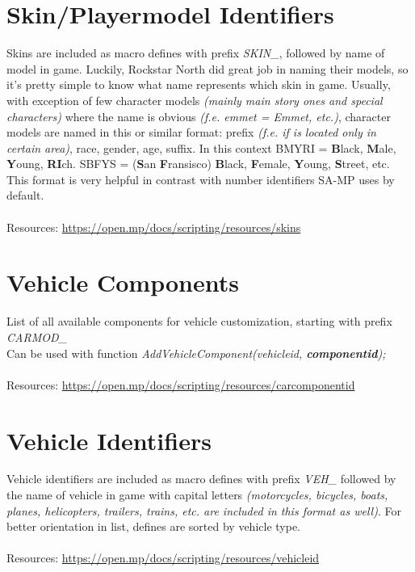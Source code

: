 \documentclass{article}
\begin{document}
\newpage
\section{Skin/Playermodel Identifiers}
Skins are included as macro defines with prefix \textit{SKIN\_}, followed by name of model in game. Luckily, Rockstar North did great job in naming their models, so it's pretty simple to know what name represents which skin in game. Usually, with exception of few character models \textit{(mainly main story ones and special characters)} where the name is obvious \textit{(f.e. emmet = Emmet, etc.)}, character models are named in this or similar format: prefix \textit{(f.e. if is located only in certain area)}, race, gender, age, suffix. In this context BMYRI = \textbf{B}lack, \textbf{M}ale, \textbf{Y}oung, \textbf{RI}ch. SBFYS = (\textbf{S}an \textbf{F}ransisco) \textbf{B}lack, \textbf{F}emale, \textbf{Y}oung, \textbf{S}treet, etc. This format is very helpful in contrast with number identifiers SA-MP uses by default.
\\
\\Resources: \url{https://open.mp/docs/scripting/resources/skins}


\section{Vehicle Components}
List of all available components for vehicle customization, starting with prefix \textit{CARMOD\_}\\Can be used with function \textit{AddVehicleComponent(vehicleid, \textbf{componentid});}
\\
\\Resources: \url{https://open.mp/docs/scripting/resources/carcomponentid}


\section{Vehicle Identifiers}
Vehicle identifiers are included as macro defines with prefix \textit{VEH\_} followed by the name of vehicle in game with capital letters \textit{(motorcycles, bicycles, boats, planes, helicopters, trailers, trains, etc. are included in this format as well)}. For better orientation in list, defines are sorted by vehicle type.
\\
\\Resources: \url{https://open.mp/docs/scripting/resources/vehicleid}
\end{document}
